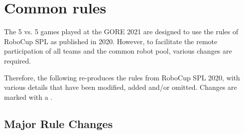 \section{Common rules}
\label{sec:Common_rules}
The 5 vs. 5 games played at the GORE 2021 are designed to use the rules of RoboCup SPL as published in 2020. However, to facilitate the remote participation of all teams and the common robot pool, various changes are required.

Therefore, the following re-produces the rules from RoboCup SPL 2020, with various details that have been modified, added and/or omitted. Changes are marked with a .

\subsection{Major Rule Changes}
\label{sec:major_rule_changes}
